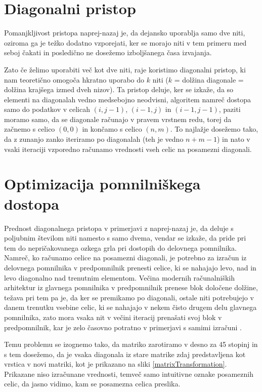 \documentclass[a4paper,12pt,openright]{book}
\begin{document}
\section{Diagonalni pristop}

Pomanjkljivost pristopa naprej-nazaj je, da dejansko uporablja samo dve niti, oziroma ga je težko dodatno vzporejati, ker se morajo niti v tem primeru med seboj čakati in posledično ne dosežemo izboljšanega časa izvajanja. 

Zato če želimo uporabiti več kot dve niti, raje koristimo diagonalni pristop, ki nam teoretično omogoča hkratno uporabo do $k$ niti ($k$ = dolžina diagonale = dolžina krajšega izmed dveh nizov). Ta pristop deluje, ker se izkaže, da so elementi na diagonalah vedno medsebojno neodvisni, algoritem namreč dostopa samo do podatkov v celicah $(i, j-1)$, $(i-1, j)$ in $(i-1, j-1)$, paziti moramo samo, da se diagonale računajo v pravem vrstnem redu, torej da začnemo s celico $(0, 0)$ in končamo s celico $(n, m)$. To najlažje dosežemo tako, da z zunanjo zanko iteriramo po diagonalah (teh je vedno $n+m-1$) in nato v vsaki iteraciji vzporedno računamo vrednosti vseh celic na posamezni diagonali. 

\section{Optimizacija pomnilniškega dostopa}

Prednost diagonalnega pristopa v primerjavi z naprej-nazaj je, da deluje s poljubnim številom niti namesto s samo dvema, vendar se izkaže, da pride pri tem do nepričakovanega ozkega grla pri dostopih do delovnega pomnilnika. Namreč, ko računamo celice na posamezni diagonali, je potrebno za izračun iz delovnega pomnilnika v predpomnilnik prenesti celice, ki se nahajajo levo, nad in levo diagonalno nad trenutnim elementom. Večina modernih računalniških arhitektur iz glavnega pomnilnika v predpomnilnik prenese blok določene dolžine, težava pri tem pa je, da ker se premikamo po diagonali, ostale niti potrebujejo v danem trenutku vsebine celic, ki se nahajajo v nekem čisto drugem delu glavnega pomnilnika, zato mora vsaka nit v večini iteracij prenašati svoj blok v predpomnilnik, kar je zelo časovno potratno v primerjavi s samimi izračuni \cite{bottleneck}. 

Temu problemu se izognemo tako, da matriko zarotiramo v desno za 45 stopinj in s tem dosežemo, da je vsaka diagonala iz stare matrike zdaj predstavljena kot vrstica v novi matriki, kot je prikazano na sliki \ref{matrixTransformation}. Prikazane niso izračunane vrednosti, temveč samo intuitivne oznake posameznih celic, da jasno vidimo, kam se posamezna celica preslika. 
\end{document}
